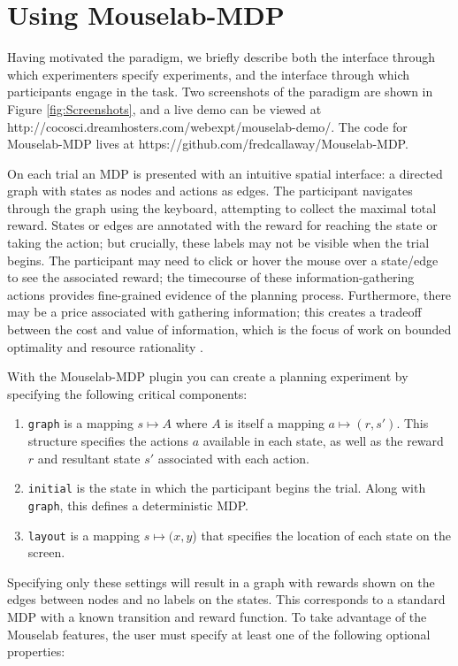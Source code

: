 \documentclass[11pt]{article} %
\begin{document}
\section{Using Mouselab-MDP}

Having motivated the paradigm, we briefly describe both the interface through which experimenters specify experiments, and the interface through which participants engage in the task. Two screenshots of the paradigm are shown in Figure \ref{fig:Screenshots}, and a live demo can be viewed at http://cocosci.dreamhosters.com/webexpt/mouselab-demo/. The code for Mouselab-MDP lives at https://github.com/fredcallaway/Mouselab-MDP.

On each trial an MDP is presented with an intuitive spatial interface: a directed graph with states as nodes and actions as edges. The participant navigates through the graph using the keyboard, attempting to collect the maximal total reward. States or edges are annotated with the reward for reaching the state or taking the action; but crucially, these labels may not be visible when the trial begins. The participant may need to click or hover the mouse over a state/edge to see the associated reward; the timecourse of these information-gathering actions provides fine-grained evidence of the planning process. Furthermore, there may be a price associated with gathering information; this creates a tradeoff between the cost and value of information, which is the focus of work on bounded optimality and resource rationality \cite{griffiths2015rational,shenhav2017toward}.

With the Mouselab-MDP plugin you can create a planning experiment by specifying the following critical components:
\begin{enumerate}
\item
  \texttt{graph} is a mapping $s \mapsto A$ where $A$ is itself a mapping $a \mapsto (r, s')$. This structure specifies the actions $a$ available in each state, as well as the reward $r$ and resultant state $s'$ associated with each action.
\item
  \texttt{initial} is the state in which the participant begins the trial. Along with \texttt{graph}, this defines a deterministic MDP.
\item
  \texttt{layout} is a mapping $s \mapsto (x, y$) that specifies the location of each state on the screen.
\end{enumerate}

Specifying only these settings will result in a graph with rewards shown on the edges between nodes and no labels on the states. This corresponds to a standard MDP with a known transition and reward function. To take advantage of the Mouselab features, the user must specify at least one of the following optional properties:
\end{document}
